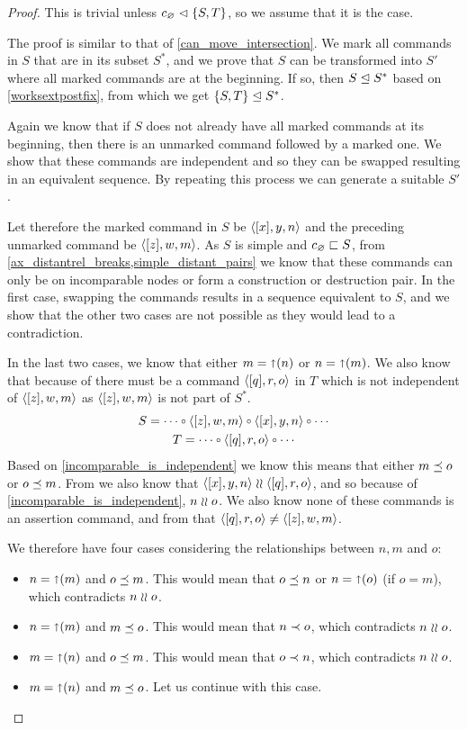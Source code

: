 \begin{proof}
This is trivial unless ${c_\varnothing}\vartriangleleft{\{{S,T}\}}$, so we assume that it is the case.

The proof is similar to that of \cref{can_move_intersection}.
We mark all commands in $S$ that are in its subset $S^*$, and
we prove that $S$ can be transformed into $S'$
where all marked commands are at the beginning.
If so, then 
${S}\trianglelefteq{S^*}$ based on \cref{worksextpostfix},
from which we get ${\{{S,T}\}}\trianglelefteq{S^*}$.

Again we know that if $S$ does not already have all marked commands at its beginning,
then there is an unmarked command followed by a marked one.
We show that these commands are independent and so they can be swapped
resulting in an equivalent sequence.
By repeating this process we can generate a suitable $S'$.

Let therefore the marked command in $S$ be $\langle{[x],y,n}\rangle$
and the preceding unmarked command be $\langle{[z],w,m}\rangle$.
As $S$ is simple and $c_\varnothing\sqsubset{S}$, from 
\cref{ax_distantrel_breaks,simple_distant_pairs}
we know that these commands can only be on incomparable nodes or form a construction or destruction pair.
In the first case, swapping the commands results in a sequence equivalent to $S$,
and we show that the other two cases are not possible as they would lead to a contradiction.

In the last two cases, we know that either $m=\mathord{\shortuparrow}(n)$ or $n=\mathord{\shortuparrow}(m)$.
We also know that because of {\condApr} there must be 
a command $\langle{[q],r,o}\rangle$ in $T$ which is not independent of $\langle{[z],w,m}\rangle$
as $\langle{[z],w,m}\rangle$ is not part of $S^*$.
\begin{gather*}
S = \cdots\cc  \czwmv\cc  \cxynv\cc  \cdots \\
T = \cdots\cc  \cqrov\cc \cdots
\end{gather*}
Based on \cref{incomparable_is_independent} we know this means that
either $m\preceq o$ or $o\preceq m$.
From {\condApr} we also know that $\langle{[x],y,n}\rangle\mathrel{\wr\wr} \langle{[q],r,o}\rangle$,
and so because of \cref{incomparable_is_independent},
$n\mathrel{\wr\wr} o$.
We also know none of these commands is an assertion command, and 
from {\condDisj} that $\langle{[q],r,o}\rangle\neq\langle{[z],w,m}\rangle$.

We therefore have four cases considering the relationships between $n,m$ and $o$:
\begin{itemize}
\item $n=\mathord{\shortuparrow}(m)$ and $o\preceq m$.
   This would mean that $o\preceq n$ or $n=\mathord{\shortuparrow}(o)$ (if $o=m$), which contradicts $n\mathrel{\wr\wr} o$.
\item $n=\mathord{\shortuparrow}(m)$ and $m\preceq o$.
   This would mean that $n\prec o$, which contradicts $n\mathrel{\wr\wr} o$.
\item $m=\mathord{\shortuparrow}(n)$ and $o\preceq m$.
   This would mean that $o\prec n$, which contradicts $n\mathrel{\wr\wr} o$.
\item $m=\mathord{\shortuparrow}(n)$ and $m\preceq o$.
   Let us continue with this case.
\end{itemize}


\end{proof}

